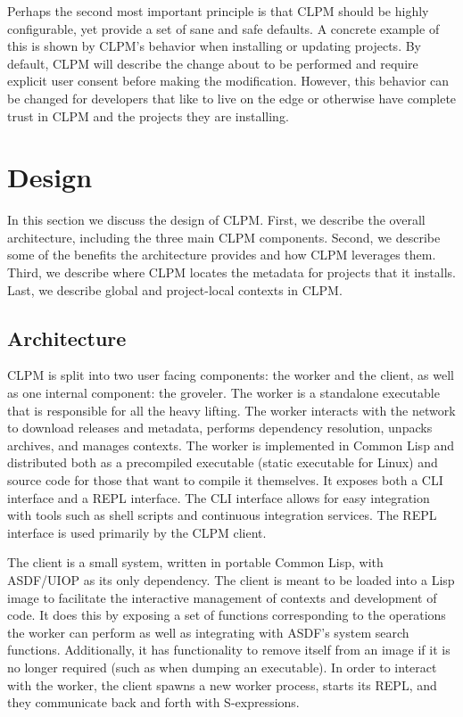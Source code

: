 \documentclass[sigconf]{acmart}
\begin{document}

Perhaps the second most important principle is that CLPM should be highly
configurable, yet provide a set of sane and safe defaults. A concrete example
of this is shown by CLPM's behavior when installing or updating projects. By
default, CLPM will describe the change about to be performed and require
explicit user consent before making the modification. However, this behavior
can be changed for developers that like to live on the edge or otherwise have
complete trust in CLPM and the projects they are installing.

\section{Design}

In this section we discuss the design of CLPM. First, we describe the overall
architecture, including the three main CLPM components. Second, we describe
some of the benefits the architecture provides and how CLPM leverages
them. Third, we describe where CLPM locates the metadata for projects that it
installs. Last, we describe global and project-local contexts in CLPM.

\subsection{Architecture}\label{sec:architecture}

CLPM is split into two user facing components: the worker and the client, as
well as one internal component: the groveler. The worker is a standalone
executable that is responsible for all the heavy lifting. The worker interacts
with the network to download releases and metadata, performs dependency
resolution, unpacks archives, and manages contexts. The worker is implemented
in Common Lisp and distributed both as a precompiled executable (static
executable for Linux) and source code for those that want to compile it
themselves. It exposes both a CLI interface and a REPL interface. The CLI
interface allows for easy integration with tools such as shell scripts and
continuous integration services. The REPL interface is used primarily by the
CLPM client.

The client is a small system, written in portable Common Lisp, with ASDF/UIOP
as its only dependency. The client is meant to be loaded into a Lisp image to
facilitate the interactive management of contexts and development of code. It
does this by exposing a set of functions corresponding to the operations the
worker can perform as well as integrating with ASDF's system search
functions. Additionally, it has functionality to remove itself from an image if
it is no longer required (such as when dumping an executable). In order to
interact with the worker, the client spawns a new worker process, starts its
REPL, and they communicate back and forth with S-expressions.
\end{document}
